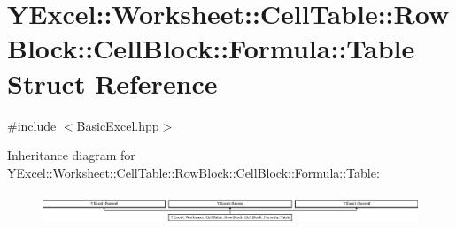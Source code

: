 \hypertarget{struct_y_excel_1_1_worksheet_1_1_cell_table_1_1_row_block_1_1_cell_block_1_1_formula_1_1_table}{}\section{Y\+Excel\+:\+:Worksheet\+:\+:Cell\+Table\+:\+:Row\+Block\+:\+:Cell\+Block\+:\+:Formula\+:\+:Table Struct Reference}
\label{struct_y_excel_1_1_worksheet_1_1_cell_table_1_1_row_block_1_1_cell_block_1_1_formula_1_1_table}


{\ttfamily \#include $<$Basic\+Excel.\+hpp$>$}

Inheritance diagram for Y\+Excel\+:\+:Worksheet\+:\+:Cell\+Table\+:\+:Row\+Block\+:\+:Cell\+Block\+:\+:Formula\+:\+:Table\+:\begin{figure}[H]
\begin{center}
\leavevmode
\includegraphics[height=0.949958cm]{struct_y_excel_1_1_worksheet_1_1_cell_table_1_1_row_block_1_1_cell_block_1_1_formula_1_1_table}
\end{center}
\end{figure}
